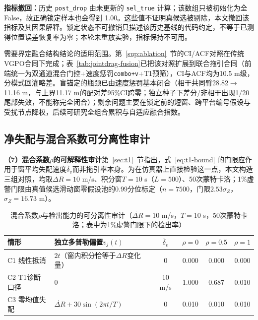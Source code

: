 \documentclass[UTF8,a4paper,zihao=-4]{ctexart}
\begin{document}
\textbf{指标撤回：}历史 \texttt{post\_drop} 由未更新的 \texttt{sel\_true} 计算；该数组只被初始化为全 False，故正确锁定样本也会得到 1.00。这些值不证明真候选被剔除，本文撤回该指标及其因果解释。锁定状态不可撤销只描述该历史基线的代码约定，不等于已测得位置误差恢复率为零；本轮未重放实验，指标保持不可用。







需要界定融合结构结论的适用范围。第~\ref{sup:ablation}~节的CI/ACF对照在传统VGPO合同下完成；表~\ref{tab:jointdrag-fusion}已把该对照扩展到联合拖引合同（前端统一为双通道混合门控+速度惩罚\texttt{combo+v}+T1预筛），CI与ACF均为10.5 m级，分模式回灌略差。盲锚定的瓶颈已由速度惩罚基本闭合（相干共同臂28.82\(\to\)11.16 m，与上界11.17 m的配对差95\%CI跨零；独立种子下差分/非相干出现1/20尾部失效，不能称完全闭合）；剩余问题主要在锁定前的短窗、跨平台编号假设与受扰节点降权，后续可研究全组合累积与自适应融合指数。



\subsection{净失配与混合系数可分离性审计}\label{sup:rho}
\noindent\textbf{（7）混合系数\(\rho\)的可解释性审计}\quad 第~\ref{sec:t1}~节指出，式~\eqref{eq:t1-bound} 的门限应作用于窗平均失配速度\(\bar\delta_v\)而非拖引率本身。为在仿真器上直接检验这一点，本文构造三组对照，均取\(\dot{\Delta R}=10\) m/s、积分窗\(T=10\) s（\(L=500\)）、50次蒙特卡洛；1\%虚警门限由真值候选滑动窗零假设池的0.99分位标定（\(n=7500\)，门限\(2.53\sigma_Z\)，\(\sigma_Z=16.73\) m）。

\begin{table}[H]
\centering
\caption{混合系数\(\rho\)与检出能力的可分离性审计（\(\dot{\Delta R}=10\) m/s，\(T=10\) s，50次蒙特卡洛；表中为1\%虚警门限下的检出率）}\label{tab:rho-audit}
\begin{tabular}{@{}llcccc@{}}
\toprule
情形 & 独立多普勒偏置\(v_j(t)\) & \(\bar\delta_v\) & \(\rho=0\) & \(\rho=0.5\) & \(\rho=1\)\\
\midrule
C1 线性抵消 & \(2t\)（窗内积分恰等于\(\Delta R\)变化量） & 0 & 0.000 & 0.000 & 0.000\\
C2 T1诊断口径 & \(0\) & 10 m/s & 1.000 & 0.687 & 0.010\\
C3 零均值失配 & \(\dot{\Delta R}+30\sin(2\pi t/T)\) & 0 & 0.010 & 0.010 & 0.010\\
\bottomrule
\end{tabular}
\par\vspace{2pt}{\footnotesize 注：C1的检出率样本为\(50\times3=150\)（固定窗\([0,10]\) s），C2/C3为7500（滑动窗）。C3的失配瞬时幅度为\(\pm30\) m/s，远大于C2的10 m/s。}
\end{table}
\end{document}
